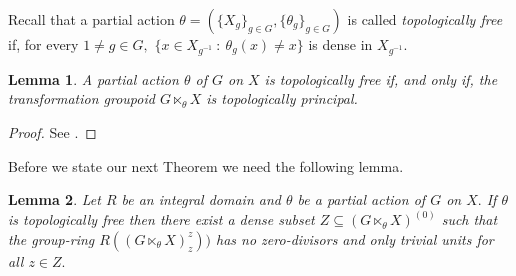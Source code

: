 \documentclass[11pt, a4paper]{amsart}
\newcommand{\Go}{\ensuremath {\mathcal{G}^{(0)}}}
\newcommand{\Gx}{\ensuremath {G \ltimes_\theta X}}
\newcommand{\an}[1]{``#1''} %
\theoremstyle{plain}
\newtheorem{theorem}{Theorem}[section]
\newtheorem{lemma}[theorem]{Lemma}
\begin{document}
Recall that a partial action $\theta=(\{X_g\}_{g \in G}, \{\theta_g\}_{g \in G})$ is called \emph{topologically free} if, for every $1 \neq g \in G,$ $\{x \in X_{g^{-1}} \ :  \ \theta_g(x) \neq x \}$ is dense in $X_{g^{-1}}.$


\begin{lemma}\label{lemmafreeprincipal}
A partial action $\theta$ of $G$ on $X$ is topologically free if, and only if, the transformation groupoid $\Gx$ is topologically principal. %
\end{lemma}

\begin{proof}
See \cite[Lemma~2.4]{Xin}.
\end{proof}






Before we state our next Theorem we need the following lemma.

\begin{lemma}\label{lemmagroupring}
Let $R$ be an integral domain and $\theta$ be a partial action of $G$ on $X.$ If $\theta$ is topologically free then there exist a dense subset $Z \subseteq  (\Gx)^{(0)}$ such that the group-ring $R((\Gx)_{z}^{z}))$  has no zero-divisors and only trivial units for all $z \in Z.$
\end{lemma}
\end{document}
